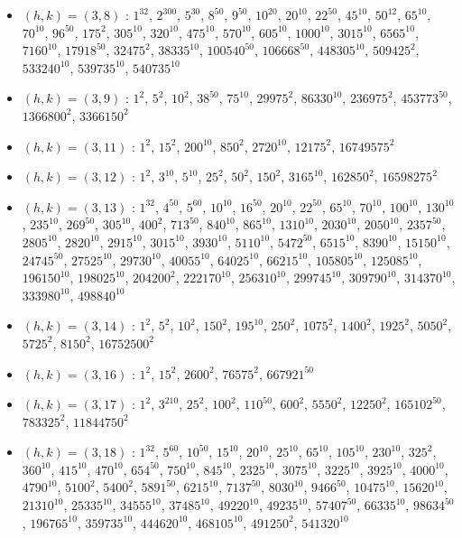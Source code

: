 \begin{itemize}
\item $(h,k)=(3,8)$ : $1^{32}$, $2^{300}$, $5^{30}$, $8^{50}$, $9^{50}$, $10^{20}$, $20^{10}$, $22^{50}$, $45^{10}$, $50^{12}$, $65^{10}$, $70^{10}$, $96^{50}$, $175^{2}$, $305^{10}$, $320^{10}$, $475^{10}$, $570^{10}$, $605^{10}$, $1000^{10}$, $3015^{10}$, $6565^{10}$, $7160^{10}$, $17918^{50}$, $32475^{2}$, $38335^{10}$, $100540^{50}$, $106668^{50}$, $448305^{10}$, $509425^{2}$, $533240^{10}$, $539735^{10}$, $540735^{10}$
\item $(h,k)=(3,9)$ : $1^{2}$, $5^{2}$, $10^{2}$, $38^{50}$, $75^{10}$, $29975^{2}$, $86330^{10}$, $236975^{2}$, $453773^{50}$, $1366800^{2}$, $3366150^{2}$
\item $(h,k)=(3,11)$ : $1^{2}$, $15^{2}$, $200^{10}$, $850^{2}$, $2720^{10}$, $12175^{2}$, $16749575^{2}$
\item $(h,k)=(3,12)$ : $1^{2}$, $3^{10}$, $5^{10}$, $25^{2}$, $50^{2}$, $150^{2}$, $3165^{10}$, $162850^{2}$, $16598275^{2}$
\item $(h,k)=(3,13)$ : $1^{32}$, $4^{50}$, $5^{60}$, $10^{10}$, $16^{50}$, $20^{10}$, $22^{50}$, $65^{10}$, $70^{10}$, $100^{10}$, $130^{10}$, $235^{10}$, $269^{50}$, $305^{10}$, $400^{2}$, $713^{50}$, $840^{10}$, $865^{10}$, $1310^{10}$, $2030^{10}$, $2050^{10}$, $2357^{50}$, $2805^{10}$, $2820^{10}$, $2915^{10}$, $3015^{10}$, $3930^{10}$, $5110^{10}$, $5472^{50}$, $6515^{10}$, $8390^{10}$, $15150^{10}$, $24745^{50}$, $27525^{10}$, $29730^{10}$, $40055^{10}$, $64025^{10}$, $66215^{10}$, $105805^{10}$, $125085^{10}$, $196150^{10}$, $198025^{10}$, $204200^{2}$, $222170^{10}$, $256310^{10}$, $299745^{10}$, $309790^{10}$, $314370^{10}$, $333980^{10}$, $498840^{10}$
\item $(h,k)=(3,14)$ : $1^{2}$, $5^{2}$, $10^{2}$, $150^{2}$, $195^{10}$, $250^{2}$, $1075^{2}$, $1400^{2}$, $1925^{2}$, $5050^{2}$, $5725^{2}$, $8150^{2}$, $16752500^{2}$
\item $(h,k)=(3,16)$ : $1^{2}$, $15^{2}$, $2600^{2}$, $76575^{2}$, $667921^{50}$
\item $(h,k)=(3,17)$ : $1^{2}$, $3^{210}$, $25^{2}$, $100^{2}$, $110^{50}$, $600^{2}$, $5550^{2}$, $12250^{2}$, $165102^{50}$, $783325^{2}$, $11844750^{2}$
\item $(h,k)=(3,18)$ : $1^{32}$, $5^{60}$, $10^{50}$, $15^{10}$, $20^{10}$, $25^{10}$, $65^{10}$, $105^{10}$, $230^{10}$, $325^{2}$, $360^{10}$, $415^{10}$, $470^{10}$, $654^{50}$, $750^{10}$, $845^{10}$, $2325^{10}$, $3075^{10}$, $3225^{10}$, $3925^{10}$, $4000^{10}$, $4790^{10}$, $5100^{2}$, $5400^{2}$, $5891^{50}$, $6215^{10}$, $7137^{50}$, $8030^{10}$, $9466^{50}$, $10475^{10}$, $15620^{10}$, $21310^{10}$, $25335^{10}$, $34555^{10}$, $37485^{10}$, $49220^{10}$, $49235^{10}$, $57407^{50}$, $66335^{10}$, $98634^{50}$, $196765^{10}$, $359735^{10}$, $444620^{10}$, $468105^{10}$, $491250^{2}$, $541320^{10}$

\end{itemize}
